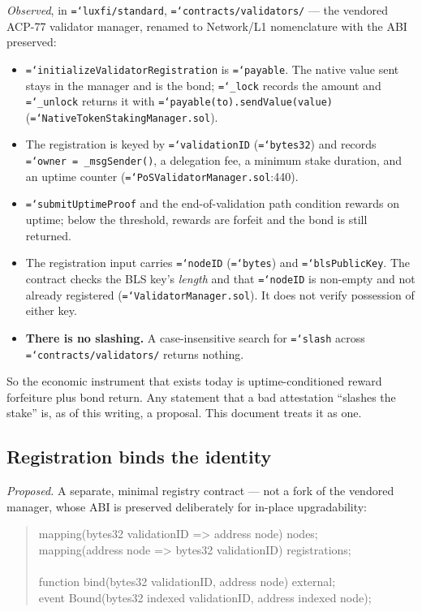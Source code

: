 \documentclass[11pt,a4paper]{article}
\newcommand{\code}[1]{\texttt{\hyphenchar\font=`\-\relax #1}}
\begin{document}
\emph{Observed}, in \code{luxfi/standard}, \code{contracts/validators/} --- the
vendored ACP-77 validator manager, renamed to Network/L1 nomenclature with the ABI
preserved:

\begin{itemize}
\item \code{initializeValidatorRegistration} is \code{payable}. The native value
  sent stays in the manager and is the bond; \code{\_lock} records the amount and
  \code{\_unlock} returns it with \code{payable(to).sendValue(value)}
  (\code{NativeTokenStakingManager.sol}).
\item The registration is keyed by \code{validationID} (\code{bytes32}) and
  records \code{owner = \_msgSender()}, a delegation fee, a minimum stake
  duration, and an uptime counter (\code{PoSValidatorManager.sol}:440).
\item \code{submitUptimeProof} and the end-of-validation path condition rewards on
  uptime; below the threshold, rewards are forfeit and the bond is still returned.
\item The registration input carries \code{nodeID} (\code{bytes}) and
  \code{blsPublicKey}. The contract checks the BLS key's \emph{length} and that
  \code{nodeID} is non-empty and not already registered
  (\code{ValidatorManager.sol}). It does not verify possession of either key.
\item \textbf{There is no slashing.} A case-insensitive search for \code{slash}
  across \code{contracts/validators/} returns nothing.
\end{itemize}

So the economic instrument that exists today is uptime-conditioned reward
forfeiture plus bond return. Any statement that a bad attestation ``slashes the
stake'' is, as of this writing, a proposal. This document treats it as one.

\subsection{Registration binds the identity}

\emph{Proposed.} A separate, minimal registry contract --- not a fork of the
vendored manager, whose ABI is preserved deliberately for in-place upgradability:

\begin{quote}\ttfamily
mapping(bytes32 validationID => address node) nodes;\\
mapping(address node => bytes32 validationID) registrations;\\
\\
function bind(bytes32 validationID, address node) external;\\
event Bound(bytes32 indexed validationID, address indexed node);
\end{quote}
\end{document}
